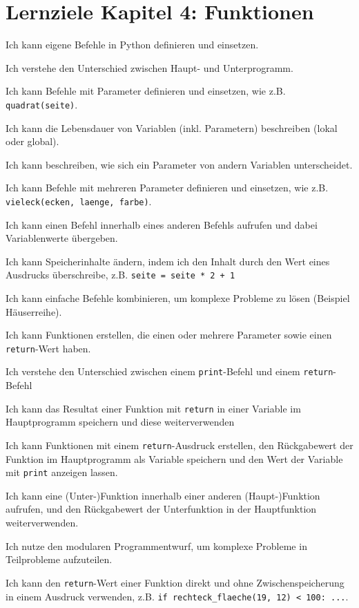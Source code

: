 \section*{Lernziele Kapitel 4: Funktionen}
\begin{todolist}
    \item Ich kann eigene Befehle in Python definieren und einsetzen.
    \item Ich verstehe den Unterschied zwischen Haupt- und Unterprogramm.
    \item Ich kann Befehle mit Parameter definieren und einsetzen, wie z.B. \lstinline|quadrat(seite)|.
    \item Ich kann die Lebensdauer von Variablen (inkl. Parametern) beschreiben (lokal oder global).
    \item Ich kann beschreiben, wie sich ein Parameter von andern Variablen unterscheidet.
    \item Ich kann Befehle mit mehreren Parameter definieren und einsetzen, wie z.B. \lstinline|vieleck(ecken, laenge, farbe)|.
    \item Ich kann einen Befehl innerhalb eines anderen Befehls aufrufen und dabei Variablenwerte übergeben.
    \item Ich kann Speicherinhalte ändern, indem ich den Inhalt durch den Wert eines Ausdrucks überschreibe, z.B. \lstinline|seite = seite * 2 + 1|
    \item Ich kann einfache Befehle kombinieren, um komplexe Probleme zu lösen (Beispiel Häuserreihe).
    \item Ich kann Funktionen erstellen, die einen oder mehrere Parameter sowie einen \lstinline|return|-Wert haben.
    \item Ich verstehe den Unterschied zwischen einem \lstinline|print|-Befehl und einem \lstinline|return|-Befehl
    \item Ich kann das Resultat einer Funktion mit \lstinline|return| in einer Variable im Hauptprogramm speichern und diese weiterverwenden
    \item Ich kann Funktionen mit einem \lstinline|return|-Ausdruck erstellen, den Rückgabewert der Funktion im Hauptprogramm als Variable speichern und den Wert der Variable mit \lstinline|print| anzeigen lassen.
    \item Ich kann eine (Unter-)Funktion innerhalb einer anderen (Haupt-)Funktion aufrufen, und den Rückgabewert der Unterfunktion in der Hauptfunktion weiterverwenden.
    \item Ich nutze den modularen Programmentwurf, um komplexe Probleme in Teilprobleme aufzuteilen.
    \item Ich kann den \lstinline|return|-Wert einer Funktion direkt und ohne Zwischenspeicherung in einem Ausdruck verwenden, z.B. \lstinline|if rechteck_flaeche(19, 12) < 100: ...|.
\end{todolist}

